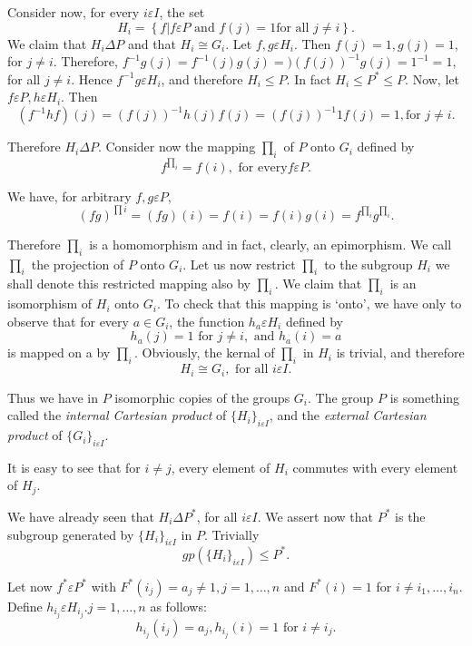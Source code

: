 Consider now, for every $i \varepsilon I$, the set
$$
H_i = \left\{ f \bigg | f  \varepsilon P \text{ and } f(j) =1 \text{
  for all } j \neq i \right\}. 
$$
We claim that $H_i \Delta P$ and that $H_i \cong G_i$. Let $f, g
\varepsilon H_i$. Then $f(j) =1, g(j) =1$, for $j \neq i$. Therefore,
$f^{-1}g(j)= f^{-1}(j) g(j)= )(f(j))^{-1} g(j) = 1^{-1}=1$, for all $j
\neq i$. Hence $f^{-1}g \varepsilon H_i$, and therefore $H_i \le
P$. In fact $H_i \le P^* \le P$. Now, let $f \varepsilon P, h
\varepsilon H_i$. Then  
$$
(f^{-1}hf)(j) = (f(j))^{-1} h(j) f(j) =(f(j))^{-1} 1f(j) =1, \text{
  for } j \neq i. 
$$ 

Therefore $H_i \Delta P$. Consider now the mapping $\prod_i$ of $P$
onto $G_i$ defined by  
$$
f^{\prod_i}= f(i), \text{ for every} f \varepsilon P.
$$

We have, for arbitrary $f, g \varepsilon P$,
$$
(fg)^{\prod i}= (fg)(i) = f(i) = f(i) g(i) =  f^{\prod_i}g^{\prod_i}.
$$

Therefore $\prod_i$ is a homomorphism and in fact, clearly, an
epimorphism. We call $\prod_i$ the projection of $P$ onto $G_i$. Let
us now restrict $\prod_i$ to the subgroup $H_i$ we shall denote this
restricted mapping also by $\prod_i$. We claim that $\prod_i$ is an
isomorphism of $H_i$ onto $G_i$.  To check that this mapping is
`onto', we have only to observe that for every $a \in G_i$, the
function $h_a \varepsilon H_i$ defined by  
$$
h_a (j) =1 \text{ for } j \neq i,  \text{ and } h_a (i) =a
$$
is mapped on a by $\prod_i$. Obviously, the kernal of $\prod_i$ in $H_i$ is
trivial, and therefore 
$$
H_i  \cong G_i,  \text{ for all } i \varepsilon I. 
$$

Thus we have in $P$ isomorphic copies of the groups $G_i$. The group
$P$ is something called the \textit{internal Cartesian product} of $\{
H_i \}_{i \varepsilon I}$, and the \textit{external Cartesian product}
of $\{ G_i\}_{ i \varepsilon I}$. 

It is easy to see that for $i \neq j$, every element of $H_i$ commutes
with every element of $H_j$. 

We have already seen that $H_i \Delta P^*$, for all $i \varepsilon
I$. We assert now that $P^*$ is the subgroup generated by $\{ H_i
\}_{i \varepsilon I}$ in $P$. Trivially 
$$
gp( \{ H_i \}_{i \varepsilon I}) \le P^*.
$$

Let now $f^* \varepsilon P^*$ with $F^*(i_j)= a_j \neq 1, j=1,  \ldots
, n$ and $F^*(i)=1$ for $i \neq i_1,  \ldots,  i_n$. Define $h_{i_j}
\varepsilon H_{i_j}. j=1, \ldots,  n$ as follows: 
$$
h_{i_j} (i_j) = a_j, h_{i_j}(i)=1 \text{ for } i \neq i_j. 
$$

